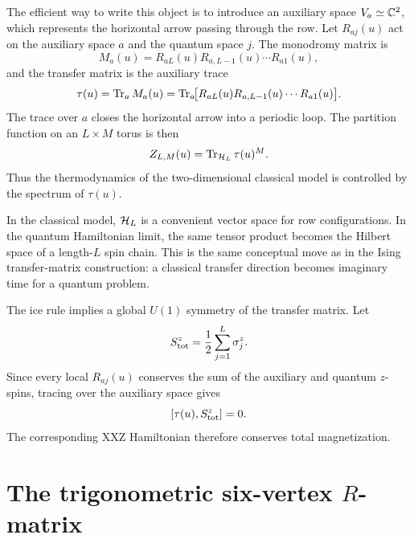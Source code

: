 The efficient way to write this object is to introduce an auxiliary space
$V_a\simeq\mathbb{C}^2$, which represents the horizontal arrow passing through the row.
Let $R_{aj}(u)$ act on the auxiliary space $a$ and the quantum space $j$.  The
monodromy matrix is
\begin{equation}
\label{eq:six-vertex-monodromy-matrix}
    M_a(u)
    =
    R_{aL}(u)R_{a,L-1}(u)\cdots R_{a1}(u),
\end{equation}
and the transfer matrix is the auxiliary trace
\begin{equation}
\label{eq:six-vertex-transfer-matrix}
    \tau(u)=\operatorname{Tr}_a M_a(u)
    =
    \operatorname{Tr}_a\!\bigl[R_{aL}(u)R_{a,L-1}(u)\cdots R_{a1}(u)\bigr] .
\end{equation}
The trace over $a$ closes the horizontal arrow into a periodic loop.  The
partition function on an $L\times M$ torus is then
\begin{equation}
\label{eq:six-vertex-partition-function-transfer}
    Z_{L,M}(u)=\operatorname{Tr}_{\mathcal{H}_L}\tau(u)^M .
\end{equation}
Thus the thermodynamics of the two-dimensional classical model is controlled by
the spectrum of $\tau(u)$.

\begin{remark}
In the classical model, $\mathcal{H}_L$ is a convenient vector space for row
configurations.  In the quantum Hamiltonian limit, the same tensor product becomes
the Hilbert space of a length-$L$ spin chain.  This is the same conceptual move as
in the Ising transfer-matrix construction: a classical transfer direction becomes
imaginary time for a quantum problem.
\end{remark}

The ice rule implies a global $U(1)$ symmetry of the transfer matrix.  Let
\begin{equation}
\label{eq:six-vertex-total-magnetization}
    S^z_{\rm tot}=\frac12\sum_{j=1}^{L}\sigma_j^z .
\end{equation}
Since every local $R_{aj}(u)$ conserves the sum of the auxiliary and quantum
$z$-spins, tracing over the auxiliary space gives
\begin{equation}
\label{eq:six-vertex-transfer-U1-conservation}
    [\tau(u),S^z_{\rm tot}]=0 .
\end{equation}
The corresponding XXZ Hamiltonian therefore conserves total magnetization.

\section{The trigonometric six-vertex \texorpdfstring{$R$}{R}-matrix}
\label{sec:six-vertex-r-matrix}

